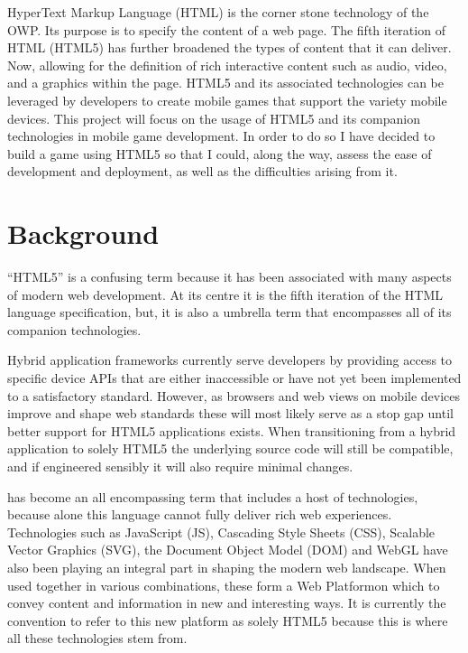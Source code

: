 \documentclass[final]{cmpreport}
\begin{document}
HyperText Markup Language (HTML) is the corner stone technology of the OWP. Its purpose is to specify the content of a web page. The fifth iteration of HTML (HTML5) has further broadened the types of content that it can deliver. Now, allowing for the definition of rich interactive content such as audio, video, and a graphics within the page. HTML5 and its associated technologies can be leveraged by developers to create mobile games that support the variety mobile devices. This project will focus on the usage of HTML5 and its companion technologies in mobile game development. In order to do so I have decided to build a game using HTML5 so that I could, along the way, assess the ease of development and deployment, as well as the difficulties arising from it.

\section{Background}

``HTML5'' is a confusing term because it has been associated with many aspects of modern web development. At its centre it is the fifth iteration of the HTML language specification, but, it is also a umbrella term that encompasses all of its companion technologies.

Hybrid application frameworks currently serve developers by providing access to specific device APIs that are either inaccessible or have not yet been implemented to a satisfactory standard. However, as browsers and web views on mobile devices improve and shape web standards these will most likely serve as a stop gap until better support for HTML5 applications exists. When transitioning from a hybrid application to solely HTML5 the underlying source code will still be compatible, and if engineered sensibly it will also require minimal changes.

has become an all encompassing term that includes a host of technologies, because alone this language cannot fully deliver rich web experiences. Technologies such as JavaScript (JS), Cascading Style Sheets (CSS), Scalable Vector Graphics (SVG), the Document Object Model (DOM) and WebGL have also been playing an integral part in shaping the modern web landscape. When used together in various combinations, these form a Web Platform\footnotemark on which to convey content and information in new and interesting ways. It is currently the convention to refer to this new platform as solely HTML5 because this is where all these technologies stem from.
\end{document}
